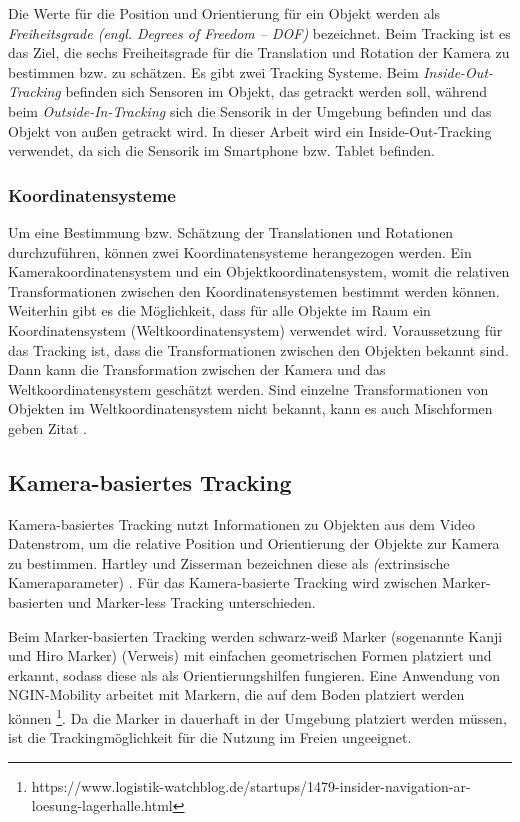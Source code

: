 Die Werte für die Position und Orientierung für ein Objekt werden als \textit{Freiheitsgrade (engl. Degrees of Freedom – DOF)} bezeichnet. Beim Tracking ist es das Ziel, die sechs Freiheitsgrade
für die Translation und Rotation der Kamera zu bestimmen bzw. zu schätzen\cite{doerner}. Es gibt zwei Tracking Systeme. Beim \textit{Inside-Out-Tracking} befinden sich Sensoren im Objekt, das getrackt werden soll, während beim \textit{Outside-In-Tracking} sich die Sensorik in der Umgebung befinden und das Objekt von außen getrackt wird. In dieser Arbeit wird ein Inside-Out-Tracking verwendet, da sich die Sensorik im Smartphone bzw. Tablet befinden.

\subsubsection{Koordinatensysteme}
Um eine Bestimmung bzw. Schätzung der Translationen und Rotationen durchzuführen, können zwei Koordinatensysteme herangezogen werden. Ein Kamerakoordinatensystem und ein Objektkoordinatensystem, womit die relativen Transformationen zwischen den Koordinatensystemen bestimmt werden können. Weiterhin gibt es die Möglichkeit, dass für alle Objekte im Raum ein Koordinatensystem (Weltkoordinatensystem) verwendet wird. Voraussetzung für das Tracking ist, dass die Transformationen zwischen den Objekten bekannt sind. Dann kann die Transformation zwischen der Kamera und das Weltkoordinatensystem geschätzt werden. Sind einzelne Transformationen von Objekten im Weltkoordinatensystem nicht bekannt, kann es auch Mischformen geben Zitat \cite*[Dörner (2019) S.124f.]{doerner}.

\subsection{Kamera-basiertes Tracking}
Kamera-basiertes Tracking nutzt Informationen zu Objekten aus dem Video Datenstrom, um die relative Position und Orientierung der Objekte zur Kamera zu bestimmen. Hartley und Zisserman bezeichnen diese als \textit(extrinsische Kameraparameter) \cite*[Hartley, Zisserman (2003) S.156]{hartleyzisserman}. Für das Kamera-basierte Tracking wird zwischen Marker-basierten und Marker-less Tracking unterschieden.

Beim Marker-basierten Tracking werden schwarz-weiß Marker (sogenannte Kanji und Hiro Marker) (Verweis) mit einfachen geometrischen Formen platziert und erkannt, sodass diese als als Orientierungshilfen fungieren. Eine Anwendung von NGIN-Mobility arbeitet mit Markern, die auf dem Boden platziert werden können \footnote{https://www.logistik-watchblog.de/startups/1479-insider-navigation-ar-loesung-lagerhalle.html}. Da die Marker in dauerhaft in der Umgebung platziert werden müssen, ist die Trackingmöglichkeit für die Nutzung im Freien ungeeignet.


